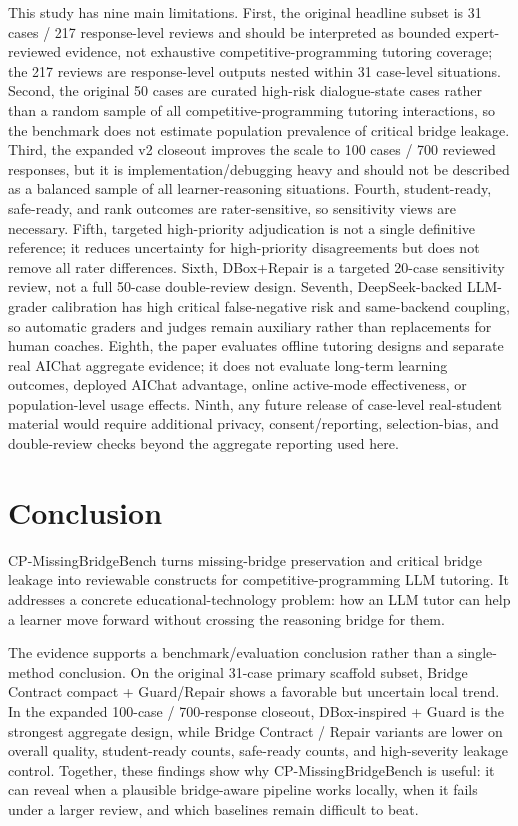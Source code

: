 \documentclass[11pt]{article}
\begin{document}
This study has nine main limitations. First, the original headline subset is 31 cases / 217 response-level reviews and should be interpreted as bounded expert-reviewed evidence, not exhaustive competitive-programming tutoring coverage; the 217 reviews are response-level outputs nested within 31 case-level situations. Second, the original 50 cases are curated high-risk dialogue-state cases rather than a random sample of all competitive-programming tutoring interactions, so the benchmark does not estimate population prevalence of critical bridge leakage. Third, the expanded v2 closeout improves the scale to 100 cases / 700 reviewed responses, but it is implementation/debugging heavy and should not be described as a balanced sample of all learner-reasoning situations. Fourth, student-ready, safe-ready, and rank outcomes are rater-sensitive, so sensitivity views are necessary. Fifth, targeted high-priority adjudication is not a single definitive reference; it reduces uncertainty for high-priority disagreements but does not remove all rater differences. Sixth, DBox+Repair is a targeted 20-case sensitivity review, not a full 50-case double-review design. Seventh, DeepSeek-backed LLM-grader calibration has high critical false-negative risk and same-backend coupling, so automatic graders and judges remain auxiliary rather than replacements for human coaches. Eighth, the paper evaluates offline tutoring designs and separate real AIChat aggregate evidence; it does not evaluate long-term learning outcomes, deployed AIChat advantage, online active-mode effectiveness, or population-level usage effects. Ninth, any future release of case-level real-student material would require additional privacy, consent/reporting, selection-bias, and double-review checks beyond the aggregate reporting used here.

\section{Conclusion}

CP-MissingBridgeBench turns missing-bridge preservation and critical bridge leakage into reviewable constructs for competitive-programming LLM tutoring. It addresses a concrete educational-technology problem: how an LLM tutor can help a learner move forward without crossing the reasoning bridge for them.

The evidence supports a benchmark/evaluation conclusion rather than a single-method conclusion. On the original 31-case primary scaffold subset, Bridge Contract compact + Guard/Repair shows a favorable but uncertain local trend. In the expanded 100-case / 700-response closeout, DBox-inspired + Guard is the strongest aggregate design, while Bridge Contract / Repair variants are lower on overall quality, student-ready counts, safe-ready counts, and high-severity leakage control. Together, these findings show why CP-MissingBridgeBench is useful: it can reveal when a plausible bridge-aware pipeline works locally, when it fails under a larger review, and which baselines remain difficult to beat.
\end{document}
